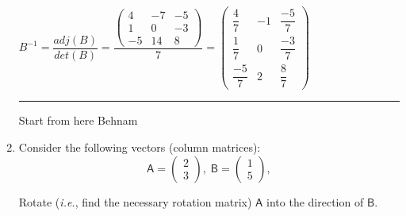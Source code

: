 \documentclass[fleqn]{article}
\begin{document}
\begin{enumerate}
    $B^{-1}= \dfrac{adj(B)}{det(B)}=\dfrac{
      \begin{pmatrix}
        4 & -7 & -5 \\
        1 & 0 & -3 \\
        -5 & 14 & 8
       \end{pmatrix}
    }{7}
    =
    \begin{pmatrix}
      \dfrac{4}{7} & -1 & \dfrac{-5}{7} \\
      \dfrac{1}{7} & 0 & \dfrac{-3}{7} \\
      \dfrac{-5}{7} & 2 & \dfrac{8}{7}
     \end{pmatrix}
    $

    \rule{16cm}{0.4pt}

    Start from here Behnam

  
  \item  Consider the following vectors (column matrices):
    \[
    \mathsf{A}=\left( 
    \begin{array}{l}
    2 \\ 
    3
    \end{array}
    \right) ,\;\mathsf{B}=\left( 
    \begin{array}{l}
    1 \\ 
    5
    \end{array}
    \right) ,
    \]

  Rotate ({\it i.e.}, find the necessary rotation matrix) $\mathsf{A}$ into the direction of $\mathsf{B}$.



\end{enumerate}
\end{document}
